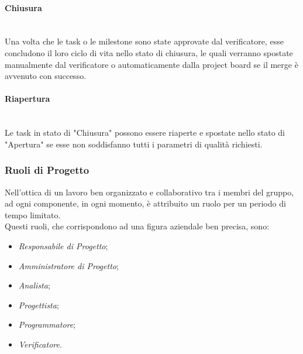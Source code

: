 	
	\paragraph{Chiusura} \-\\
	Una volta che le task o le milestone sono state approvate dal verificatore, esse concludono il loro ciclo di vita nello stato di chiusura, le quali verranno spostate manualmente dal verificatore o automaticamente dalla project board se il merge è avvenuto con successo. 
	
\paragraph{Riapertura} \-\\ \label{ProcessiOrganizzativi_Riapertura}
	Le task in stato di "Chiusura" possono essere riaperte e spostate nello stato di "Apertura" se esse non soddisfanno tutti i parametri di qualità richiesti.
	
\subsubsection{Ruoli di Progetto}\label{ProcessiOrganizzativi_RuoliProgetto}
	Nell'ottica di un lavoro ben organizzato e collaborativo tra i membri del gruppo, ad ogni componente, in ogni 					momento, è attribuito un ruolo per un periodo di tempo limitato.\\
	Questi ruoli, che corrispondono ad una figura aziendale ben precisa, sono:
	\begin{itemize}
	\item \textit{Responsabile di Progetto};
	\item \textit{Amministratore di Progetto};
	\item \textit{Analista};
	\item \textit{Progettista};
	\item \textit{Programmatore};
	\item \textit{Verificatore}.
	\end{itemize}
	
	